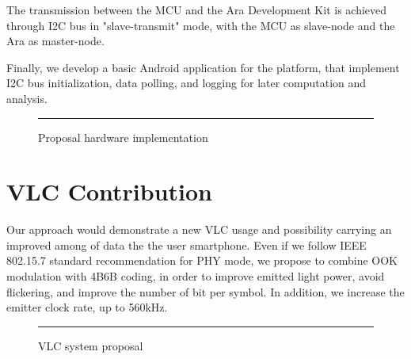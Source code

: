 The transmission between the MCU and the Ara Development Kit is achieved through I2C bus in "slave-transmit" mode, with the MCU as slave-node and the Ara as master-node.

Finally, we develop a basic Android application for the platform, that implement I2C bus initialization, data polling, and logging for later computation and analysis.

\begin{figure}[htbp]
  \centering
    \rule{35em}{0.5pt}
  \caption[Proposal hardware implementation]{Proposal hardware implementation}
  \label{fig:RxCircuit}
\end{figure}



\section{VLC Contribution}

Our approach would demonstrate a new VLC usage and possibility carrying an improved among of data the the user smartphone. Even if we follow IEEE 802.15.7 standard recommendation for PHY mode, we propose to combine OOK modulation with 4B6B coding, in order to improve emitted light power, avoid flickering, and improve the number of bit per symbol. In addition, we increase the emitter clock rate, up to 560kHz.

\begin{figure}[htbp]
  \centering
    \rule{35em}{0.5pt}
  \caption[VLC system proposal]{VLC system proposal}
  \label{fig:RxCircuit}
\end{figure}